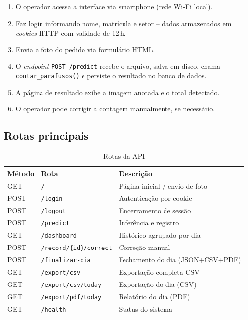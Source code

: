 \documentclass[12pt,a4paper]{article}
\begin{document}
\begin{enumerate}[leftmargin=*]
  \item O operador acessa a interface via smartphone (rede Wi-Fi local).
  \item Faz login informando nome, matr\'icula e setor -- dados armazenados em
        \emph{cookies} HTTP com validade de 12\,h.
  \item Envia a foto do pedido via formul\'ario HTML.
  \item O \emph{endpoint} \texttt{POST /predict} recebe o arquivo, salva em disco,
        chama \texttt{contar\_parafusos()} e persiste o resultado no banco de dados.
  \item A p\'agina de resultado exibe a imagem anotada e o total detectado.
  \item O operador pode corrigir a contagem manualmente, se necess\'ario.
\end{enumerate}

\subsection{Rotas principais}

\begin{table}[H]
  \centering
  \caption{Rotas da API}
  \label{tab:rotas}
  \begin{tabular}{lll}
    \toprule
    \textbf{M\'etodo} & \textbf{Rota} & \textbf{Descri\c{c}\~ao} \\
    \midrule
    GET  & \texttt{/}                & P\'agina inicial / envio de foto \\
    POST & \texttt{/login}           & Autentica\c{c}\~ao por cookie \\
    POST & \texttt{/logout}          & Encerramento de sess\~ao \\
    POST & \texttt{/predict}         & Infer\^encia e registro \\
    GET  & \texttt{/dashboard}       & Hist\'orico agrupado por dia \\
    POST & \texttt{/record/\{id\}/correct} & Corre\c{c}\~ao manual \\
    POST & \texttt{/finalizar-dia}   & Fechamento do dia (JSON+CSV+PDF) \\
    GET  & \texttt{/export/csv}      & Exporta\c{c}\~ao completa CSV \\
    GET  & \texttt{/export/csv/today}& Exporta\c{c}\~ao do dia (CSV) \\
    GET  & \texttt{/export/pdf/today}& Relat\'orio do dia (PDF) \\
    GET  & \texttt{/health}          & Status do sistema \\
    \bottomrule
  \end{tabular}
\end{table}
\end{document}
